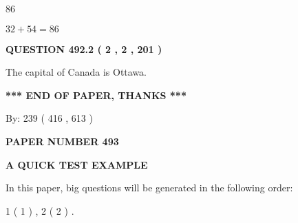 \documentclass[12pt]{article}
\begin{document}
86
 
 
 
 
\noindent{}

$ %
32 +  %
54=   %
86$
 
 
  
\vspace{0.2in}
  
{\textbf{\Large{QUESTION
492.2 
 ( 2 , 2 , 201 )
}}}
  
  
 
 
\noindent{}
 
 
The capital of Canada is Ottawa.
 
 
 
 
   
   
 \vspace{0.2in}
 
   
   
   
   
\vspace{1.0in} 
{\textbf{\large{ *** END OF PAPER, THANKS *** }}} 
   
   
\hspace{1.0in} By: 
 239 ( 416 ,  613 )
   
   
   
   
\newpage 
\setcounter{page}{ 
   493001 } 
   
   
   
   
 {\textbf{ \Large{ PAPER NUMBER  493  }}}
   
   
\vspace{0.2in}
   
   
   
   
   
   
 \vspace{0.2in}
{\LARGE {\textbf{ A QUICK TEST EXAMPLE}}}
   
   
   
\vspace{0.2in}
   
In this paper, big questions will be generated in the following order: 
   
   
   1 ( 1 )
 ,
   2 ( 2 )
 .
  
\vspace{0.2in}
  
\end{document}
